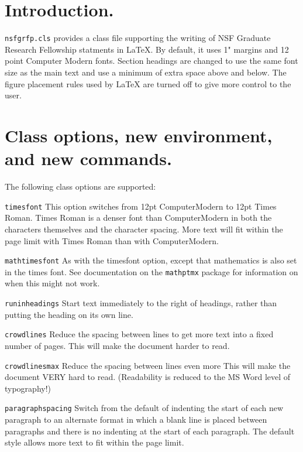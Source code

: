 \documentclass[timesfont,runinheadings]{nsfgrfp}
\begin{document}
\section*{Introduction.}

\texttt{nsfgrfp.cls} provides a class file supporting the writing of NSF
Graduate Research Fellowship statments in \LaTeX.  By default, it uses
1" margins and 12 point Computer Modern fonts.  Section headings are
changed to use the same font size as the main text and use a minimum of
extra space above and below.  The figure placement rules used by \LaTeX
are turned off to give more control to the user.

\section*{Class options, new environment, and new commands.}

The following class options are supported:

\vspace{0.5ex}

\begin{compactdesc}

\item[\texttt{timesfont}]
This option switches from 12pt ComputerModern to 12pt Times
Roman.  Times Roman is a denser font than ComputerModern in both
the characters themselves and the character spacing.  More text
will fit within the page limit with Times Roman than with
ComputerModern.

\item[\texttt{mathtimesfont}]
As with the timesfont option, except that mathematics is also set in the
times font.  See documentation on the \texttt{mathptmx} package for
information on when this might not work.

\item[\texttt{runinheadings}]
Start text immediately to the right of headings, rather than
putting the heading on its own line.

\item[\texttt{crowdlines}]
Reduce the spacing between lines to get more text into a fixed
number of pages.  This will make the document harder to read.

\item[\texttt{crowdlinesmax}]
Reduce the spacing between lines even more This will make the document
VERY hard to read.  (Readability is reduced to the MS Word level of
typography!)

\item[\texttt{paragraphspacing}]
Switch from the default of indenting the start of each new
paragraph to an alternate format in which a blank line is placed
between paragraphs and there is no indenting at the start of each
paragraph. The default style allows more text to fit within the
page limit.

\end{compactdesc}
\end{document}
